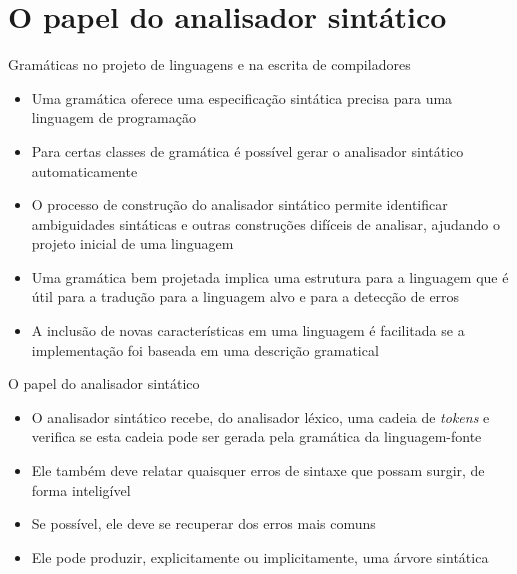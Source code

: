 \section{O papel do analisador sintático}

\begin{frame}[fragile]{Gramáticas no projeto de linguagens e na escrita de compiladores}

    \begin{itemize}
        \item Uma gramática oferece uma especificação sintática precisa para uma linguagem de programação
        \pause

        \item Para certas classes de gramática é possível gerar o analisador sintático automaticamente
        \pause

        \item O processo de construção do analisador sintático permite identificar ambiguidades sintáticas e outras construções difíceis de analisar, ajudando o
            projeto inicial de uma linguagem
        \pause

        \item Uma gramática bem projetada implica uma estrutura para a linguagem que é útil para a tradução para a linguagem alvo e para a detecção de erros
        \pause

        \item A inclusão de novas características em uma linguagem é facilitada se a implementação foi baseada em uma descrição gramatical
    \end{itemize}

\end{frame}

\begin{frame}[fragile]{O papel do analisador sintático}

    \begin{itemize}
        \item O analisador sintático recebe, do analisador léxico, uma cadeia de \textit{tokens} e verifica se esta cadeia pode ser gerada pela gramática da
            linguagem-fonte
        \pause

        \item Ele também deve relatar quaisquer erros de sintaxe que possam surgir, de forma inteligível
        \pause

        \item Se possível, ele deve se recuperar dos erros mais comuns
        \pause

        \item Ele pode produzir, explicitamente ou implicitamente, uma árvore sintática 
    \end{itemize}

\end{frame}

